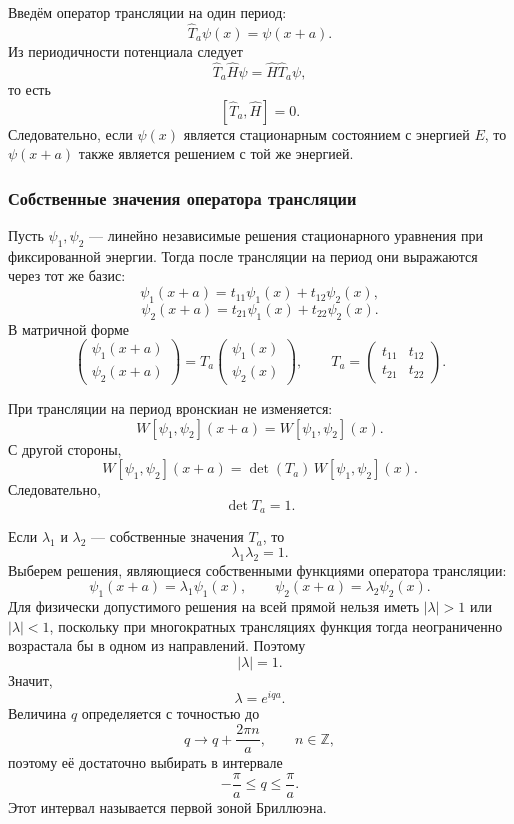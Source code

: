 \documentclass[12pt,a4paper]{article}
\begin{document}
Введём оператор трансляции на один период:
\[
    \boxed{
        \hat T_a\psi(x)=\psi(x+a)
    }.
\]
Из периодичности потенциала следует
\[
    \hat T_a\hat H\psi
    =
    \hat H\hat T_a\psi,
\]
то есть
\[
    \boxed{
        [\hat T_a,\hat H]=0
    }.
\]
Следовательно, если $\psi(x)$ является стационарным состоянием с
энергией $E$, то $\psi(x+a)$ также является решением с той же
энергией.


\subsubsection{Собственные значения оператора трансляции}

Пусть $\psi_1,\psi_2$ --- линейно независимые решения стационарного
уравнения при фиксированной энергии. Тогда после трансляции на период
они выражаются через тот же базис:
\[
    \psi_1(x+a)
    =
    t_{11}\psi_1(x)
    +
    t_{12}\psi_2(x),
\]
\[
    \psi_2(x+a)
    =
    t_{21}\psi_1(x)
    +
    t_{22}\psi_2(x).
\]
В матричной форме
\[
    \begin{pmatrix}
        \psi_1(x+a)\\
        \psi_2(x+a)
    \end{pmatrix}
    =
    T_a
    \begin{pmatrix}
        \psi_1(x)\\
        \psi_2(x)
    \end{pmatrix},
    \qquad
    T_a=
    \begin{pmatrix}
        t_{11}&t_{12}\\
        t_{21}&t_{22}
    \end{pmatrix}.
\]

При трансляции на период вронскиан не изменяется:
\[
    W[\psi_1,\psi_2](x+a)
    =
    W[\psi_1,\psi_2](x).
\]
С другой стороны,
\[
    W[\psi_1,\psi_2](x+a)
    =
    \det(T_a)\,
    W[\psi_1,\psi_2](x).
\]
Следовательно,
\[
    \boxed{
        \det T_a=1
    }.
\]

Если $\lambda_1$ и $\lambda_2$ --- собственные значения $T_a$, то
\[
    \boxed{
        \lambda_1\lambda_2=1
    }.
\]
Выберем решения, являющиеся собственными функциями оператора
трансляции:
\[
    \psi_1(x+a)=\lambda_1\psi_1(x),
    \qquad
    \psi_2(x+a)=\lambda_2\psi_2(x).
\]
Для физически допустимого решения на всей прямой нельзя иметь
$|\lambda|>1$ или $|\lambda|<1$, поскольку при многократных
трансляциях функция тогда неограниченно возрастала бы в одном из
направлений. Поэтому
\[
    |\lambda|=1.
\]
Значит,
\[
    \boxed{
        \lambda=e^{iqa}
    }.
\]
Величина $q$ определяется с точностью до
\[
    q\longrightarrow q+\frac{2\pi n}{a},
    \qquad
    n\in\mathbb Z,
\]
поэтому её достаточно выбирать в интервале
\[
    \boxed{
        -\frac{\pi}{a}
        \leq
        q
        \leq
        \frac{\pi}{a}
    }.
\]
Этот интервал называется первой зоной Бриллюэна.
\end{document}
